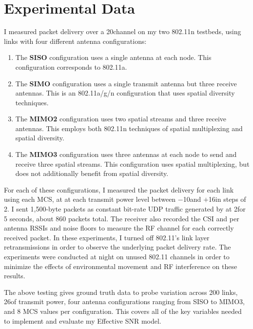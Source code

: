\section{Experimental Data}
I measured packet delivery over a 20\MHz channel on my two 802.11n testbeds, using links with four different antenna configurations:
\begin{enumerate}[parsep=1ex,itemsep=1ex,topsep=1ex]
\item The \textbf{SISO} configuration uses a single antenna at each node. This configuration corresponds to 802.11a.
\item The \textbf{SIMO} configuration uses a single transmit antenna but three receive antennas. This is an 802.11a/g/n configuration that uses spatial diversity techniques.
\item The \textbf{MIMO2} configuration uses two spatial streams and three receive antennas. This employs both 802.11n techniques of spatial multiplexing and spatial diversity.
\item The \textbf{MIMO3} configuration uses three antennas at each node to send and receive three spatial streams. This configuration uses spatial multiplexing, but does not additionally benefit from spatial diversity.
\end{enumerate}

For each of these configurations, I measured the packet delivery for each link using each MCS, at at each transmit power level between $-$10\dBm and $+$16\dBm in steps of 2\dB. I sent 1,500-byte packets as constant bit-rate UDP traffic generated by  at 2\Mbps for 5 seconds, about 860 packets total. The receiver also recorded the CSI and per antenna RSSIs and noise floors to measure the RF channel for each correctly received packet. In these experiments, I turned off 802.11's link layer retransmissions in order to observe the underlying packet delivery rate. The experiments were conducted at night on unused 802.11 channels in order to minimize the effects of environmental movement and RF interference on these results.


The above testing gives ground truth data to probe variation across 200 links, 26\dB of transmit power, four antenna configurations ranging from SISO to MIMO3, and 8 MCS values per configuration. This covers all of the key variables needed to implement and evaluate my Effective SNR model.

